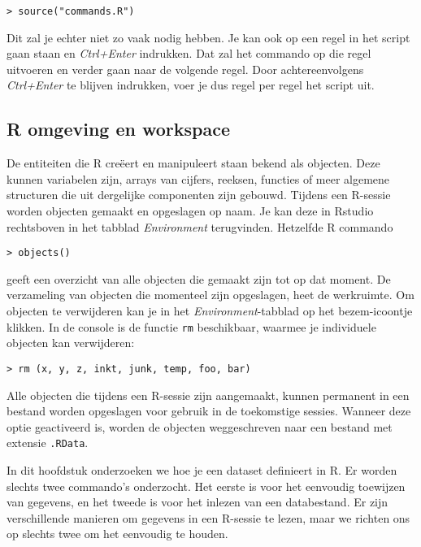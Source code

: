 \begin{lstlisting}
> source("commands.R")
\end{lstlisting}

Dit zal je echter niet zo vaak nodig hebben. Je kan ook op een regel in het script gaan staan en \textit{Ctrl+Enter} indrukken. Dat zal het commando op die regel uitvoeren en verder gaan naar de volgende regel. Door achtereenvolgens \textit{Ctrl+Enter} te blijven indrukken, voer je dus regel per regel het script uit.

\subsection{R omgeving en workspace}

De entiteiten die R cre\"eert en manipuleert staan bekend als objecten. Deze kunnen variabelen zijn, arrays van cijfers, reeksen, functies of meer algemene structuren die uit dergelijke componenten zijn gebouwd. Tijdens een R-sessie worden objecten gemaakt en opgeslagen op naam. Je kan deze in Rstudio rechtsboven in het tabblad \textit{Environment} terugvinden. Hetzelfde R commando

\begin{lstlisting}
> objects()
\end{lstlisting}

geeft een overzicht van alle objecten die gemaakt zijn tot op dat moment.
De verzameling van objecten die momenteel zijn opgeslagen, heet de werkruimte.
Om objecten te verwijderen kan je in het \textit{Environment}-tabblad op het bezem-icoontje klikken. In de console is de functie \texttt{rm} beschikbaar, waarmee je individuele objecten kan verwijderen:

\begin{lstlisting}
> rm (x, y, z, inkt, junk, temp, foo, bar)
\end{lstlisting}

Alle objecten die tijdens een R-sessie zijn aangemaakt, kunnen permanent in een bestand worden opgeslagen voor gebruik in de toekomstige sessies. Wanneer deze optie geactiveerd is, worden de objecten weggeschreven naar een bestand met extensie \texttt{.RData}.

In dit hoofdstuk onderzoeken we hoe je een dataset definieert in R. Er worden slechts twee commando's onderzocht. Het eerste is voor het eenvoudig toewijzen van gegevens, en het tweede is voor het inlezen van een databestand. Er zijn verschillende manieren om gegevens in een R-sessie te lezen, maar we richten ons op slechts twee om het eenvoudig te houden.

